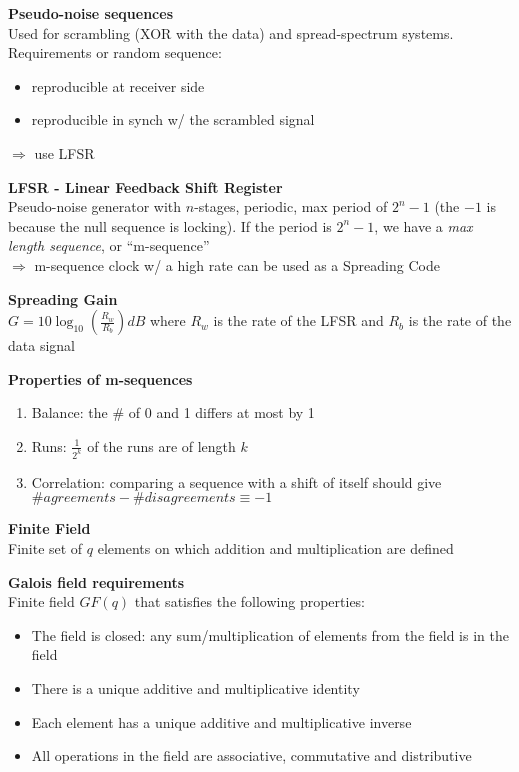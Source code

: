 \documentclass[10pt,letterpaper,landscape]{report}
\newcommand{\boxheight}{21.59cm}
\newcommand{\boxwidth}{8.85cm}
\begin{document}
\begin{small}
{\begin{minipage}[t][\boxheight][c]{\boxwidth}
	\textbf{Pseudo-noise sequences}\\
	Used for scrambling (XOR with the data) and spread-spectrum systems. Requirements or random sequence: 
	\begin{itemize}
	    \item reproducible at receiver side
	    \item reproducible in synch w/ the scrambled signal
	\end{itemize}
	$\Rightarrow$ use LFSR
	
	\textbf{LFSR - Linear Feedback Shift Register}\\
	Pseudo-noise generator with $n$-stages, periodic, max period of $2^n - 1$ (the $-1$ is because the null sequence is locking). If the period is $2^n - 1$, we have a \textit{max length sequence}, or ``m-sequence'' \\
	$\Rightarrow$ m-sequence clock w/ a high rate can be used as a Spreading Code
	
	\textbf{Spreading Gain}\\
	$G = 10 \log_{10}\left(\frac{R_w}{R_b}\right)dB$ where $R_w$ is the rate of the LFSR and $R_b$ is the rate of the data signal
	
	\textbf{Properties of m-sequences}
	\begin{enumerate}
	    \item Balance: the \# of 0 and 1 differs at most by 1
	    \item Runs: $\frac{1}{2^k}$ of the runs are of length $k$
	    \item Correlation: comparing a sequence with a shift of itself should give $\#agreements - \#disagreements \equiv -1$
	\end{enumerate}
	
	\textbf{Finite Field}\\
	Finite set of $q$ elements on which addition and multiplication are defined
	
	\textbf{Galois field requirements}\\
	Finite field $GF(q)$ that satisfies the following properties: 
	\begin{itemize}
	    \item The field is closed: any sum/multiplication of elements from the field is in the field
	    \item There is a unique additive and multiplicative identity
	    \item Each element has a unique additive and multiplicative inverse
	    \item All operations in  the field are associative, commutative and distributive
	\end{itemize}
	

\end{minipage}}
\end{small}
\end{document}
